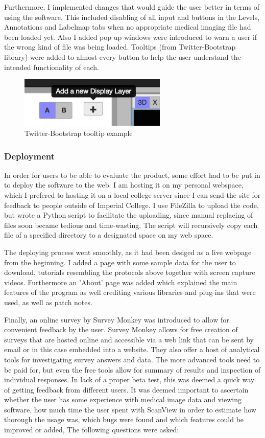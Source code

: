 \documentclass[a4paper,11pt,twoside]{article}
\begin{document}
Furthermore, I implemented changes that would guide the user better in terms of using the software. This included disabling of all input and buttons in the Levels, Annotations and Labelmap tabs when no appropriate medical imaging file had been loaded yet. Also I added pop up windows were introduced to warn a user if the wrong kind of file was being loaded. Tooltips (from Twitter-Bootstrap library) were added to almost every button to help the user understand the intended functionality of each.


\begin{figure}[ht!]
\centering
\includegraphics[width=70mm]{graphics/tooltipExample_01.png}
\caption{Twitter-Bootstrap tooltip example}
\label{fig:UIdesign1}
\end{figure}


\subsubsection{Deployment}


In order for users to be able to evaluate the product, some effort had to be put in to deploy the software to the web. I am hosting it on my personal webspace, which I prefered to hosting it on a local college server since I can send the site for feedback to people outside of Imperial College. I use FileZilla to upload the code, but wrote a Python script to facilitate the uploading, since manual replacing of files soon became tedious and time-wasting. The script will recursively copy each file of a specified directory to a designated space on my web space.

The deploying process went smoothly, as it had been desiged as a live webpage from the beginning. I added a page with some sample data for the user to download, tutorials resembling the protocols above together with screen capture videos. Furthermore an 'About' page was added which explained the main features of the program as well crediting various libraries and plug-ins that were used, as well as patch notes. 

Finally, an online survey by Survey Monkey was introduced to allow for convenient feedback by the user. Survey Monkey allows for free creation of surveys that are hosted online and accessible via a web link that can be sent by email or in this case embedded into a website. They also offer a host of analytical tools for investigating survey answers and data. The more advanced tools need to be paid for, but even the free tools allow for summary of results and inspection of individual responses. In lack of a proper beta test, this was deemed a quick way of getting feedback from different users. It was deemed important to ascertain whether the user has some experience with medical image data and viewing software, how much time the user spent with ScanView in order to estimate how thorough the usage was, which bugs were found and which features could be improved or added, The following questions were asked:
\end{document}
